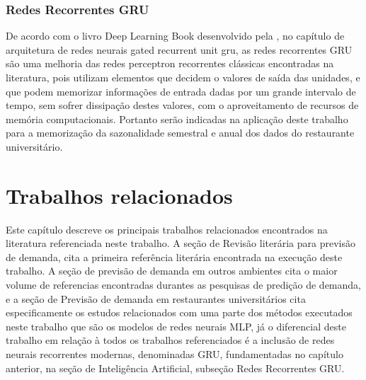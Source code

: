 \documentclass[	12pt, Times, openright, twoside, a4paper, english, brazil]{abntex2}
\begin{document}
        \subsection{Redes Recorrentes GRU}
         	De acordo com  o livro Deep Learning Book desenvolvido pela  \cite{DLB}, no capítulo de arquitetura de redes neurais gated recurrent unit gru, as redes recorrentes GRU são uma melhoria das redes perceptron recorrentes clássicas encontradas na literatura, pois utilizam elementos que decidem o valores de saída das unidades, e que podem memorizar informações de entrada dadas por um grande intervalo de tempo, sem sofrer dissipação destes valores, com o aproveitamento de recursos de memória computacionais. Portanto serão indicadas na aplicação deste trabalho para a memorização da sazonalidade semestral e anual dos dados do restaurante universitário.
            \begin{figure}[H]
            \end{figure}
  \chapter{Trabalhos relacionados}
    Este capítulo descreve os principais trabalhos relacionados encontrados na literatura referenciada neste trabalho.
    A seção de Revisão literária para previsão de demanda, cita a primeira referência literária encontrada na execução deste trabalho.
    A seção de previsão de demanda em outros ambientes cita o maior volume de referencias encontradas durantes as pesquisas de predição de demanda, e a seção de Previsão de demanda em restaurantes universitários cita especificamente os estudos relacionados com uma parte dos métodos executados neste trabalho que são os modelos de redes neurais MLP, já o diferencial deste trabalho em relação à todos os trabalhos referenciados é a inclusão de redes neurais recorrentes modernas, denominadas GRU, fundamentadas no capítulo anterior, na seção de Inteligência Artificial, subseção Redes Recorrentes GRU.
    
\end{document}
